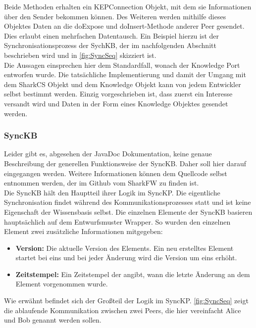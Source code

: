 \documentclass[a4paper]{article}
\begin{document}
	Beide Methoden erhalten ein KEPConnection Objekt, mit dem sie Informationen 
	über den Sender bekommen können. Des Weiteren werden mithilfe dieses 
	Objektes Daten an die doExpose und doInsert-Methode anderer Peer gesendet.
	Dies erlaubt einen mehrfachen Datentausch. Ein Beispiel hierzu ist
	der Synchronisationsprozess der SychKB, der im nachfolgenden Abschnitt
	beschrieben wird und in \autoref{fig:SyncSeq} skizziert ist. \\
	
	Die Aussagen einsprechen hier dem Standardfall, wonach
	der Knowledge Port entworfen wurde. Die tatsächliche Implementierung und
	damit der Umgang mit dem SharkCS Objekt und dem Knowledge Objekt kann von jedem
	Entwickler selbst bestimmt werden. Einzig vorgeschrieben ist, dass zuerst
	ein Interesse versandt wird und Daten in der Form eines Knowledge Objektes
	gesendet werden.
	
	\subsubsection{SyncKB}
	\label{sec:SyncKB}
	
	Leider gibt es, abgesehen der JavaDoc Dokumentation, keine genaue
	Beschreibung der generellen Funktionsweise der SyncKB. Daher soll hier darauf
	eingegangen werden. Weitere Informationen
	können dem Quellcode selbst entnommen werden, der im Github vom SharkFW
	zu finden ist. \cite{SyncKB} \\
	
	Die SyncKB hält den Hauptteil ihrer Logik im SyncKP. Die eigentliche
	Synchronisation findet während des Kommunikationsprozesses statt und ist
	keine Eigenschaft der Wissensbasis selbst. Die einzelnen Elemente der SyncKB
	basieren hauptsächlich auf dem Entwurfsmuster Wrapper. So wurden den einzelnen
	Element zwei zusätzliche Informationen mitgegeben: 
	
	\begin{itemize}
		\item \textbf{Version:} Die aktuelle Version des Elements. Ein neu 
		erstelltes Element startet bei eins und bei jeder Änderung wird die
		Version um eins erhöht.
		\item \textbf{Zeitstempel:} Ein Zeitstempel der angibt, wann die letzte
		Änderung an dem Element vorgenommen wurde.
	\end{itemize} 
	
	Wie erwähnt befindet sich der Großteil der Logik im SyncKP.
	\autoref{fig:SyncSeq} zeigt die ablaufende Kommunikation zwischen zwei
	Peers, die hier vereinfacht Alice und Bob genannt werden sollen.	
	
\end{document}
